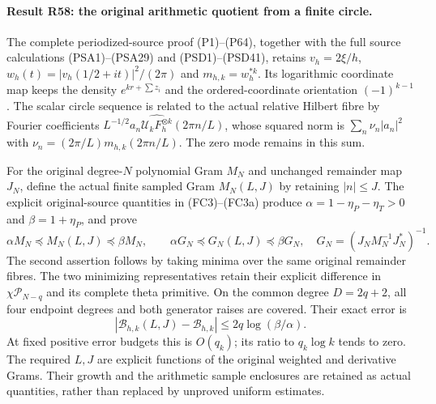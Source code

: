 \paragraph{Result R58: the original arithmetic quotient from a finite circle.}
The complete periodized-source proof (P1)--(P64), together with the
full source calculations (PSA1)--(PSA29) and (PSD1)--(PSD41), retains
$v_h=2\xi/h$, $w_h(t)=|v_h(1/2+it)|^2/(2\pi)$ and
$m_{h,k}=w_h^{*k}$. Its logarithmic coordinate map keeps the density
$e^{kr+\sum z_i}$ and the ordered-coordinate orientation
$(-1)^{k-1}$. The scalar circle sequence is related to the actual
relative Hilbert fibre by Fourier coefficients
$L^{-1/2}a_n\widehat{\mathcal U_kF_h^{\otimes k}}(2\pi n/L)$,
whose squared norm is $\sum_n\nu_n|a_n|^2$ with
$\nu_n=(2\pi/L)m_{h,k}(2\pi n/L)$. The zero mode remains in this sum.

For the original degree-$N$ polynomial Gram $M_N$ and unchanged
remainder map $J_N$, define the actual finite sampled Gram
$M_N(L,J)$ by retaining $|n|\le J$. The explicit original-source
quantities in (FC3)--(FC3a) produce
$\alpha=1-\eta_P-\eta_T>0$ and $\beta=1+\eta_P$, and prove
\[
 \alpha M_N\preceq M_N(L,J)\preceq\beta M_N,\qquad
 \alpha G_N\preceq G_N(L,J)\preceq\beta G_N,
 \quad G_N=(J_NM_N^{-1}J_N^*)^{-1}.
\]
The second assertion follows by taking minima over the same original
remainder fibres. The two minimizing representatives retain their
explicit difference in $\chi\mathcal P_{N-q}$ and its complete
theta primitive. On the common degree $D=2q+2$, all four endpoint
degrees and both generator raises are covered. Their exact error is
\[
 \left|\mathcal B_{h,k}(L,J)-\mathcal B_{h,k}\right|
      \le2q\log(\beta/\alpha).
\]
At fixed positive error budgets this is $O(q_k)$; its ratio to
$q_k\log k$ tends to zero. The required $L,J$ are explicit functions
of the original weighted and derivative Grams. Their growth and the
arithmetic sample enclosures are retained as actual quantities, rather
than replaced by unproved uniform estimates.

